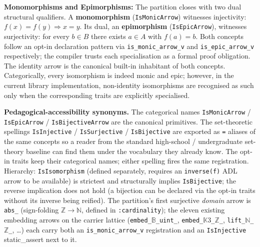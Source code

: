 \documentclass[11pt, a4paper]{report}
\begin{document}
\textbf{Monomorphisms and Epimorphisms:} The partition closes with two dual structural qualifiers. A \textbf{monomorphism} (\texttt{IsMonicArrow}) witnesses injectivity: $f(x) = f(y) \Rightarrow x = y$. Its dual, an \textbf{epimorphism} (\texttt{IsEpicArrow}), witnesses surjectivity: for every $b \in B$ there exists $a \in A$ with $f(a) = b$. Both concepts follow an opt-in declaration pattern via \texttt{is\_monic\_arrow\_v} and \texttt{is\_epic\_arrow\_v} respectively; the compiler trusts each specialisation as a formal proof obligation. The identity arrow is the canonical built-in inhabitant of both concepts. Categorically, every isomorphism is indeed monic and epic; however, in the current library implementation, non-identity isomorphisms are recognised as such only when the corresponding traits are explicitly specialised.

\textbf{Pedagogical-accessibility synonyms.} The categorical names \texttt{IsMonicArrow} / \texttt{IsEpicArrow} / \texttt{IsBijectiveArrow} are the canonical primitives. The set-theoretic spellings \texttt{IsInjective} / \texttt{IsSurjective} / \texttt{IsBijective} are exported as \texttt{=} aliases of the same concepts so a reader from the standard high-school / undergraduate set-theory baseline can find them under the vocabulary they already know. The opt-in traits keep their categorical names; either spelling fires the same registration. Hierarchy: \texttt{IsIsomorphism} (defined separately, requires an \texttt{inverse(f)} ADL arrow to be available) is strictest and structurally implies \texttt{IsBijective}; the reverse implication does not hold (a bijection can be declared via the opt-in traits without its inverse being reified). The partition's first surjective \emph{domain} arrow is \texttt{abs\_} (sign-folding $\mathbb{Z} \to \mathbb{N}$, defined in \texttt{:cardinality}); the eleven existing embedding arrows on the carrier lattice (\texttt{embed\_$\mathbb{B}$\_uint\_}, \texttt{embed\_$\mathbb{K}3$\_$\mathbb{Z}$\_}, \texttt{lift\_$\mathbb{N}$\_$\mathbb{Z}$\_}, \ldots) each carry both an \texttt{is\_monic\_arrow\_v} registration and an \texttt{IsInjective} static\_assert next to it.
\end{document}
